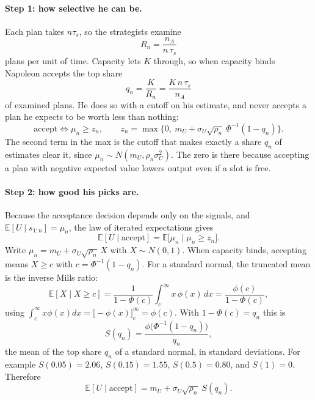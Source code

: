 \documentclass[11pt]{article}
\newcommand{\Nap}{\textcolor{nap}{Napoleon}}
\theoremstyle{remark}
\newcommand{\E}{\mathbb{E}}
\newcommand{\accept}{\text{accept}}
\begin{document}
\paragraph{Step 1: how selective he can be.} Each plan takes $n\tau_s$, so the strategists examine
\[
R_n=\frac{n_A}{n\,\tau_s}
\]
plans per unit of time. Capacity lets $K$ through, so when capacity binds \Nap{} accepts the top share
\[
q_n=\frac{K}{R_n}=\frac{K\,n\,\tau_s}{n_A}
\]
of examined plans. He does so with a cutoff on his estimate, and never accepts a plan he expects to be worth less than nothing:
\begin{equation}\label{eq:cutoff}
\accept\iff\mu_n\ge z_n,\qquad z_n=\max\Big\{0,\ m_U+\sigma_U\sqrt{\rho_n}\,\Phi^{-1}(1-q_n)\Big\}.
\end{equation}
The second term in the max is the cutoff that makes exactly a share $q_n$ of estimates clear it, since $\mu_n\sim N(m_U,\rho_n\sigma_U^2)$. The zero is there because accepting a plan with negative expected value lowers output even if a slot is free.

\paragraph{Step 2: how good his picks are.} Because the acceptance decision depends only on the signals, and $\E[U\mid s_{1:n}]=\mu_n$, the law of iterated expectations gives
\[
\E[U\mid\accept]=\E\big[\mu_n\mid\mu_n\ge z_n\big].
\]
Write $\mu_n=m_U+\sigma_U\sqrt{\rho_n}\,X$ with $X\sim N(0,1)$. When capacity binds, accepting means $X\ge c$ with $c=\Phi^{-1}(1-q_n)$. For a standard normal, the truncated mean is the inverse Mills ratio:
\[
\E[X\mid X\ge c]=\frac{1}{1-\Phi(c)}\int_c^\infty x\,\phi(x)\,dx=\frac{\phi(c)}{1-\Phi(c)},
\]
using $\int_c^\infty x\phi(x)dx=\big[-\phi(x)\big]_c^\infty=\phi(c)$. With $1-\Phi(c)=q_n$ this is
\[
S(q_n)=\frac{\phi\big(\Phi^{-1}(1-q_n)\big)}{q_n},
\]
the mean of the top share $q_n$ of a standard normal, in standard deviations. For example $S(0.05)=2.06$, $S(0.15)=1.55$, $S(0.5)=0.80$, and $S(1)=0$. Therefore
\[
\E[U\mid\accept]=m_U+\sigma_U\sqrt{\rho_n}\;S(q_n).
\]
\end{document}

